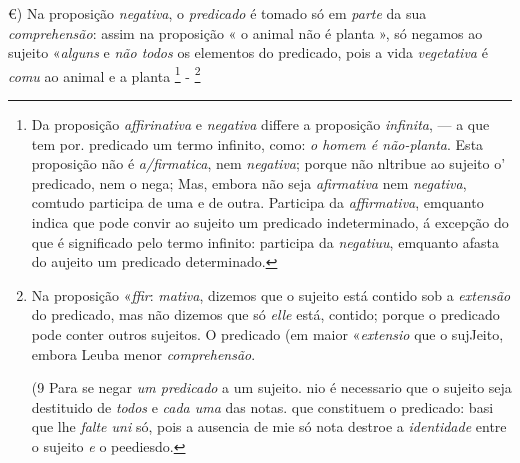 €) Na proposição \emph{negativa}, o \emph{predicado} é tomado só em \emph{parte} da sua \emph{comprehensão}: assim na proposição « o animal não é planta », só negamos ao sujeito «\emph{alguns} e \emph{não todos} os elementos do predicado, pois a vida \emph{vegetativa} é \emph{comu} ao animal e a planta \footnote{Da proposição \emph{affirinativa} e \emph{negativa} differe a proposição \emph{infinita}, --- a que tem por. predicado um termo infinito, como: \emph{o homem é não-planta}. Esta proposição não é \emph{a/firmatica}, nem \emph{negativa}; porque não nltribue ao sujeito o' predicado, nem o nega; Mas, embora não seja \emph{afirmativa} nem \emph{negativa}, comtudo participa de uma e de outra. Participa da \emph{affirmativa}, emquanto indica que pode convir ao sujeito um predicado indeterminado, á excepção do que é significado pelo termo infinito: participa da \emph{negatiuu}, emquanto afasta do aujeito um predicado determinado.} - \textbar{}\footnote{Na proposição «\emph{ffir}: \emph{mativa}, dizemos que o sujeito está contido sob a \emph{extensão} do predicado, mas não dizemos que só \emph{elle} está, contido; porque o predicado pode conter outros sujeitos. O predicado (em maior «\emph{extensio} que o sujJeito, embora Leuba menor \emph{comprehensão}.\par (9 Para se negar \emph{um predicado} a um sujeito. nio é necessario que o sujeito seja destituido de \emph{todos} e \emph{cada uma} das notas. que constituem o predicado: basi que lhe \emph{falte uni} só, pois a ausencia de mie só nota destroe a \emph{identidade} entre o sujeito \emph{e} o peediesdo.}

